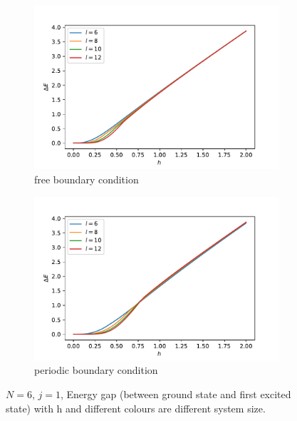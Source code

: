 \documentclass[a4paper]{extarticle}
\begin{document}
\begin{figure}[h!]
  \begin{subfigure}[h]{0.95\textwidth}
        \includegraphics[height=.73\linewidth]{../plots/pl_ising_fbc}
        \caption{free boundary condition}
        \label{fig:fbc}
    \end{subfigure}
  \begin{subfigure}[h]{0.95\textwidth}
        \includegraphics[height=.73\linewidth]{../plots/pl_ising}
        \caption{periodic boundary condition}
        \label{fig:pbc}
    \end{subfigure}
    \caption[Energy gap (between ground state and first excited state) with h with different system size.]{$N=6$, $j=1$, Energy gap (between ground state and first excited state) with h and different colours are different system size.}
    \label{fig:Egvsh_fes}
\end{figure}
\end{document}
